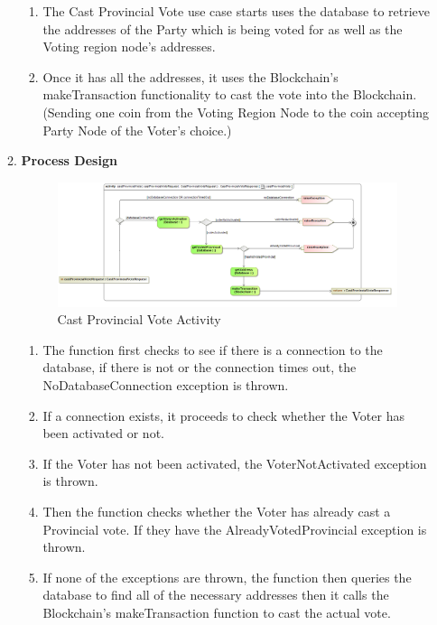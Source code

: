\begin{enumerate}
\begin{enumerate}
		\begin{enumerate}
			\item The Cast Provincial Vote use case starts uses the database to retrieve the addresses of the Party which is being voted for as well as the Voting region node's addresses.   
			\item Once it has all the addresses, it uses the Blockchain's makeTransaction functionality to cast the vote into the Blockchain. (Sending one coin from the Voting Region Node to the coin accepting Party Node of the Voter's choice.) 
		\end{enumerate}
		
		
		\item \textbf{Process Design}
		\begin{figure}[H]
			\centering
			\includegraphics[width=0.75\linewidth]{../Images/Voter/ActivityDiagrams/castProvincialVote_activity.png}
			\caption{Cast Provincial Vote Activity}
		\end{figure}
		
		\begin{enumerate}
			\item The function first checks to see if there is a connection to the database, if there is not or the connection times out, the NoDatabaseConnection exception is thrown. 
			\item If a connection exists, it proceeds to check whether the Voter has been activated or not. 
			\item If the Voter has not been activated, the VoterNotActivated exception is thrown. 
			\item Then the function checks whether the Voter has already cast a Provincial vote. If they have the AlreadyVotedProvincial exception is thrown.
			\item If none of the exceptions are thrown, the function then queries the database to find all of the necessary addresses then it calls the Blockchain's makeTransaction function to cast the actual vote.  
			
		\end{enumerate}
	\end{enumerate}
\end{enumerate}









